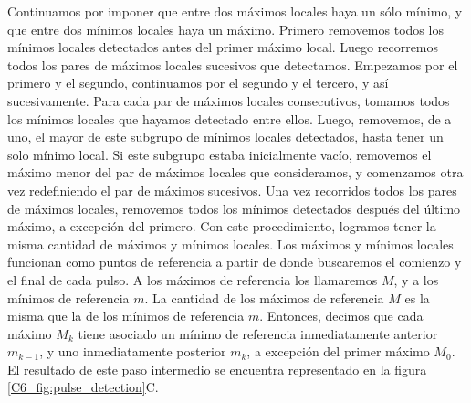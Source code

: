 \documentclass[./main.tex]{subfiles}
\begin{document}
Continuamos por imponer que entre dos máximos locales haya un sólo mínimo, y que entre dos mínimos locales haya un máximo. Primero removemos todos los mínimos locales detectados antes del primer máximo local. Luego recorremos todos los pares de máximos locales sucesivos que detectamos. Empezamos por el primero y el segundo, continuamos por el segundo y el tercero, y así sucesivamente. Para cada par de máximos locales consecutivos, tomamos todos los mínimos locales que hayamos detectado entre ellos. Luego, removemos, de a uno, el mayor de este subgrupo de mínimos locales detectados, hasta tener un solo mínimo local. Si este subgrupo estaba inicialmente vacío, removemos el máximo menor del par de máximos locales que consideramos, y comenzamos otra vez redefiniendo el par de máximos sucesivos. Una vez recorridos todos los pares de máximos locales, removemos todos los mínimos detectados después del último máximo, a excepción del primero. Con este procedimiento, logramos tener la misma cantidad de máximos y mínimos locales. Los máximos y mínimos locales funcionan como puntos de referencia a partir de donde buscaremos el comienzo y el final de cada pulso. A los máximos de referencia los llamaremos $M$, y a los mínimos de referencia $m$. La cantidad de los máximos de referencia $M$ es la misma que la de los mínimos de referencia $m$. Entonces, decimos que cada máximo $M_k$ tiene asociado un mínimo de referencia inmediatamente anterior $m_{k-1}$, y uno inmediatamente posterior $m_{k}$, a excepción del primer máximo $M_0$. El resultado de este paso intermedio se encuentra representado en la figura \ref{C6_fig:pulse_detection}C.
\end{document}
